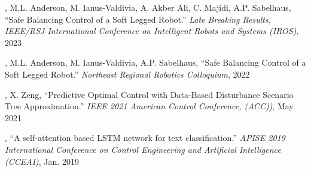 { %
\begin{etaremune}[itemsep=0.0cm]
\item \myname, M.L. Anderson, M. Ianus-Valdivia, A. Akber Ali, C. Majidi, A.P. Sabelhaus, ``Safe Balancing Control of a Soft Legged Robot.'' {\it Late Breaking Results, IEEE/RSJ International Conference on Intelligent Robots and Systems (IROS)}, 2023
\item \myname, M.L. Anderson, M. Ianus-Valdivia, A.P. Sabelhaus, ``Safe Balancing Control of a Soft Legged Robot.'' {\it Northeast Regional Robotics Colloquium}, 2022
\item \myname, X. Zeng, ``Predictive Optimal Control with Data-Based Disturbance Scenario Tree Approximation.'' {\it IEEE 2021 American Control Conference, (ACC))}, May 2021
\item \myname, ``A self-attention based LSTM network for text classification.'' {\it APISE 2019 International Conference on Control Engineering and Artificial Intelligence (CCEAI)}, Jan. 2019
\end{etaremune}
}